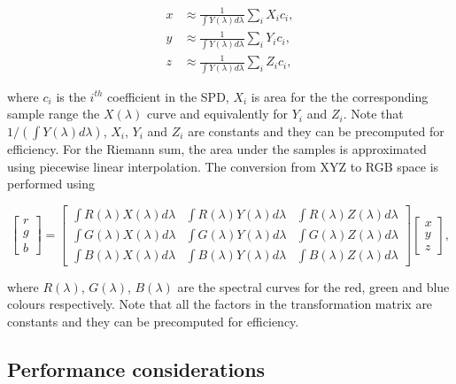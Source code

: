\begin{equation}
\begin{split}
x &\approx \frac{1}{\int Y(\lambda) d\lambda} \sum_i X_i c_i, \\
y &\approx \frac{1}{\int Y(\lambda) d\lambda} \sum_i Y_i c_i, \\
z &\approx \frac{1}{\int Y(\lambda) d\lambda} \sum_i Z_i c_i,
\end{split}
\end{equation}

where $c_i$ is the $i^{th}$ coefficient in the SPD, $X_i$ is area for the the corresponding sample range the $X(\lambda)$ curve and equivalently for $Y_i$ and $Z_i$.
Note that $1 / \left(\int Y(\lambda) d\lambda \right)$, $X_i$, $Y_i$ and $Z_i$ are constants and they can be precomputed for efficiency.
For the Riemann sum, the area under the samples is approximated using piecewise linear interpolation.
The conversion from XYZ to RGB space is performed using

\begin{equation}
\begin{bmatrix}
r \\
g \\
b
\end{bmatrix}
 = 
\begin{bmatrix}
\int R(\lambda) X(\lambda) d\lambda & \int R(\lambda) Y(\lambda) d\lambda & \int R(\lambda) Z(\lambda) d\lambda \\
\int G(\lambda) X(\lambda) d\lambda & \int G(\lambda) Y(\lambda) d\lambda & \int G(\lambda) Z(\lambda) d\lambda \\
\int B(\lambda) X(\lambda) d\lambda & \int B(\lambda) Y(\lambda) d\lambda & \int B(\lambda) Z(\lambda) d\lambda
\end{bmatrix}
\begin{bmatrix}
x \\
y \\
z
\end{bmatrix},
\end{equation}

where $R(\lambda)$, $G(\lambda)$, $B(\lambda)$ are the spectral curves for the red, green and blue colours respectively.
Note that all the factors in the transformation matrix are constants and they can be precomputed for efficiency.

\subsection{Performance considerations}
\label{sec:performance_considerations}

